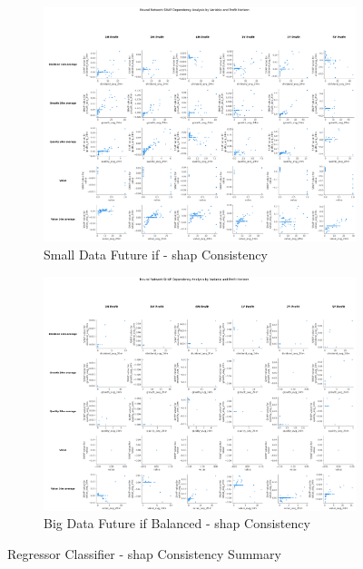 \documentclass[11pt,english,a4paper,hidelinks]{book}
\begin{document}
\begin{figure}[H]
    \centering
    \begin{subfigure}{0.48\textwidth}
        \centering
        \includegraphics[width=\textwidth]{images/code/models/neural_network/regressor_nn/Small Data future - Multi 2/shap_table_analysis.png}
        \caption{Small Data Future \acrshort{if} - \gls{shap} Consistency}
        \label{fig:small_binary_shap_consistency}
    \end{subfigure}
    \hfill
    \begin{subfigure}{0.48\textwidth}
        \centering
        \includegraphics[width=\textwidth]{images/code/models/neural_network/regressor_nn/Big Data future - IF HARD Balanced/shap_table_analysis.png}
        \caption{Big Data Future \acrshort{if} Balanced - \gls{shap} Consistency}
        \label{fig:big_binary_shap_consistency}
    \end{subfigure}
    \caption{Regressor Classifier - \gls{shap} Consistency Summary}
\end{figure}
\end{document}
